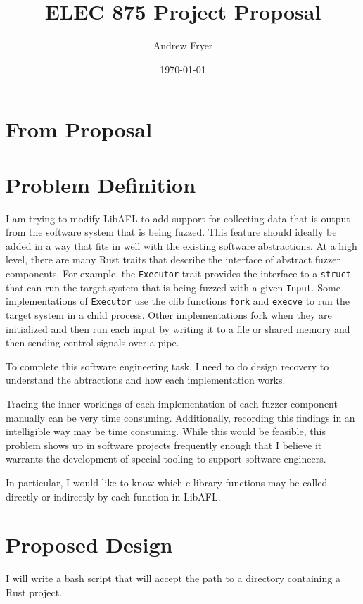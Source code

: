 \documentclass[11pt]{article}
\title{ELEC 875 Project Proposal}
\author{Andrew Fryer}
\date{\today}
\begin{document}
\maketitle

\section{From Proposal}
\section{Problem Definition}

I am trying to modify LibAFL to add support for collecting data that is output from the software system that is being fuzzed.
This feature should ideally be added in a way that fits in well with the existing software abstractions.
At a high level, there are many Rust traits that describe the interface of abstract fuzzer components.
For example, the \lstinline{Executor} trait provides the interface to a \lstinline{struct} that can run the target system that is being fuzzed with a given \lstinline{Input}.
Some implementations of \lstinline{Executor} use the clib functions \lstinline{fork} and \lstinline{execve} to run the target system in a child process.
Other implementations fork when they are initialized and then run each input by writing it to a file or shared memory and then sending control signals over a pipe.

To complete this software engineering task, I need to do design recovery to understand the abtractions and how each implementation works.

Tracing the inner workings of each implementation of each fuzzer component manually can be very time consuming.
Additionally, recording this findings in an intelligible way may be time consuming.
While this would be feasible, this problem shows up in software projects frequently enough that I believe it warrants the development of special tooling to support software engineers.

In particular, I would like to know which c library functions may be called directly or indirectly by each function in LibAFL.

\section{Proposed Design}

I will write a bash script that will accept the path to a directory containing a Rust project.
\end{document}
